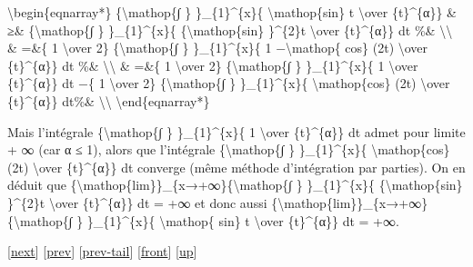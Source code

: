 \documentclass[]{article}
\begin{document}
\textbackslash{}begin\{eqnarray*\} \{\textbackslash{}mathop\{∫ \}
\}\_\{1\}\^{}\{x\}\{ \textbar{}\textbackslash{}mathop\{sin\} t\textbar{}
\textbackslash{}over \{t\}\^{}\{α\}\} \& ≥\& \{\textbackslash{}mathop\{∫
\} \}\_\{1\}\^{}\{x\}\{ \{\textbackslash{}mathop\{sin\} \}\^{}\{2\}t
\textbackslash{}over \{t\}\^{}\{α\}\} dt \%\&
\textbackslash{}\textbackslash{} \& =\&\{ 1 \textbackslash{}over 2\}
\{\textbackslash{}mathop\{∫ \} \}\_\{1\}\^{}\{x\}\{ 1
−\textbackslash{}mathop\{ cos\} (2t) \textbackslash{}over
\{t\}\^{}\{α\}\} dt \%\& \textbackslash{}\textbackslash{} \& =\&\{ 1
\textbackslash{}over 2\} \{\textbackslash{}mathop\{∫ \}
\}\_\{1\}\^{}\{x\}\{ 1 \textbackslash{}over \{t\}\^{}\{α\}\} dt −\{ 1
\textbackslash{}over 2\} \{\textbackslash{}mathop\{∫ \}
\}\_\{1\}\^{}\{x\}\{ \textbackslash{}mathop\{cos\} (2t)
\textbackslash{}over \{t\}\^{}\{α\}\} dt\%\&
\textbackslash{}\textbackslash{} \textbackslash{}end\{eqnarray*\}

Mais l'intégrale \{\textbackslash{}mathop\{∫ \} \}\_\{1\}\^{}\{x\}\{ 1
\textbackslash{}over \{t\}\^{}\{α\}\} dt admet pour limite + ∞ (car α ≤
1), alors que l'intégrale \{\textbackslash{}mathop\{∫ \}
\}\_\{1\}\^{}\{x\}\{ \textbackslash{}mathop\{cos\} (2t)
\textbackslash{}over \{t\}\^{}\{α\}\} dt converge (même méthode
d'intégration par parties). On en déduit que
\{\textbackslash{}mathop\{lim\}\}\_\{x→+∞\}\{\textbackslash{}mathop\{∫
\} \}\_\{1\}\^{}\{x\}\{ \{\textbackslash{}mathop\{sin\} \}\^{}\{2\}t
\textbackslash{}over \{t\}\^{}\{α\}\} dt = +∞ et donc aussi
\{\textbackslash{}mathop\{lim\}\}\_\{x→+∞\}\{\textbackslash{}mathop\{∫
\} \}\_\{1\}\^{}\{x\}\{ \textbar{}\textbackslash{}mathop\{ sin\}
t\textbar{} \textbackslash{}over \{t\}\^{}\{α\}\} dt = +∞.

{[}\href{coursse56.html}{next}{]} {[}\href{coursse54.html}{prev}{]}
{[}\href{coursse54.html\#tailcoursse54.html}{prev-tail}{]}
{[}\href{coursse55.html}{front}{]}
{[}\href{coursch10.html\#coursse55.html}{up}{]}
\end{document}
